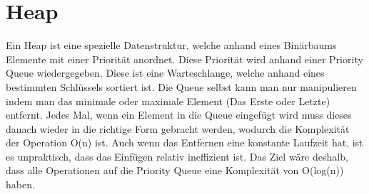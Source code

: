 \documentclass{article}
\begin{document}
		\section{Heap}
	Ein Heap ist eine spezielle Datenstruktur, welche anhand eines Binärbaums Elemente mit einer Priorität anordnet. Diese Priorität wird anhand einer Priority Queue wiedergegeben. Diese ist eine Warteschlange, welche anhand eines bestimmten Schlüssels sortiert ist. Die Queue selbst kann man nur manipulieren indem man das minimale oder maximale Element (Das Erste oder Letzte) entfernt. Jedes Mal, wenn ein Element in die Queue eingefügt wird muss dieses danach wieder in die richtige Form gebracht werden, wodurch die Komplexität der Operation O(n) ist. Auch wenn das Entfernen eine konstante Laufzeit hat, ist es unpraktisch, dass das Einfügen relativ ineffizient ist. Das Ziel wäre deshalb, dass alle Operationen auf die Priority Queue eine Komplexität von O(log(n)) haben.
\end{document}
